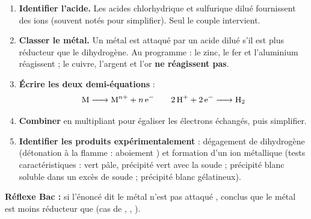 \documentclass[11pt]{article}
\newcommand{\cle}[1]{{\popxbold\color{popdark}#1}}
\begin{document}
\begin{methode}
\begin{enumerate}
\item \textbf{Identifier l'acide.} Les acides chlorhydrique  et sulfurique dilué  fournissent des ions  (souvent notés  pour simplifier). Seul le couple  intervient.
\item \textbf{Classer le métal.} Un métal est attaqué par un acide dilué s'il est \cle{plus réducteur que le dihydrogène}. Au programme : le zinc, le fer et l'aluminium réagissent ; le cuivre, l'argent et l'or \textbf{ne réagissent pas}.
\item \textbf{Écrire les deux demi-équations} :
\[ \ce{M -> M^{n+} + n e^-} \qquad \ce{2H+ + 2e^- -> H2} \]
\item \textbf{Combiner} en multipliant pour égaliser les électrons échangés, puis simplifier.
\item \textbf{Identifier les produits expérimentalement} : dégagement de dihydrogène (détonation à la flamme : \og aboiement \fg) et formation d'un ion métallique (tests caractéristiques :  vert pâle, précipité vert avec la soude ;  précipité blanc soluble dans un excès de soude ;  précipité blanc gélatineux).
\end{enumerate}
\textbf{Réflexe Bac :} si l'énoncé dit \og le métal n'est pas attaqué \fg, conclus que le métal est moins réducteur que  (cas de , , ).
\end{methode}
\end{document}
